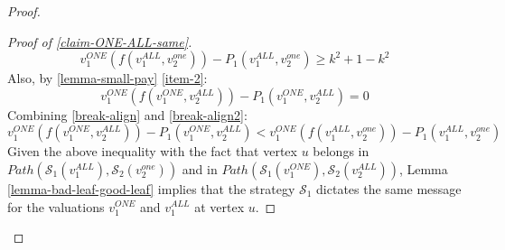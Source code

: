 \begin{proof}
\begin{proof}[Proof of \cref{claim-ONE-ALL-same}]
\begin{equation}
v_1^{ONE}(f(v_1^{ALL},v_2^{one}))-P_1(v_1^{ALL},v_2^{one}) \ge k^2+1-k^2     
\end{equation}
Also, by \cref{lemma-small-pay}  \cref{item-2}:
\begin{equation}\label{break-align2}
  v_1^{ONE}(f(v_1^{ONE},v_2^{ALL}))  
-P_1(v_1^{ONE},v_2^{ALL})=0   
\end{equation}
Combining \cref{break-align} and \cref{break-align2}:
\begin{equation*}
    v_1^{ONE}(f(v_1^{ONE},v_2^{ALL}))  
-P_1(v_1^{ONE},v_2^{ALL})<  v_1^{ONE}(f(v_1^{ALL},v_2^{one}))-P_1(v_1^{ALL},v_2^{one})
\end{equation*}
Given the above inequality with the fact that 
vertex $u$ belongs in $Path(\mathcal S_1(v_1^{ALL}),\mathcal S_2(v_2^{one}))$ and in
$Path(\mathcal{S}_1(v_1^{ONE}),\mathcal{S}_2(v_2^{ALL}))$,
Lemma \ref{lemma-bad-leaf-good-leaf}
implies  
that the strategy $\mathcal S_1$ dictates the same message for the valuations $v_1^{ONE}$ and $v_1^{ALL}$ at vertex $u$. 
\end{proof}


\end{proof}
